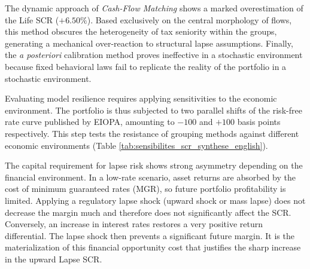 The dynamic approach of \textit{Cash-Flow Matching} shows a marked overestimation of the Life SCR ($+6.50\%$). Based exclusively on the central morphology of flows, this method obscures the heterogeneity of tax seniority within the groups, generating a mechanical over-reaction to structural lapse assumptions. Finally, the \textit{a posteriori} calibration method proves ineffective in a stochastic environment because fixed behavioral laws fail to replicate the reality of the portfolio in a stochastic environment.

Evaluating model resilience requires applying sensitivities to the economic environment. The portfolio is thus subjected to two parallel shifts of the risk-free rate curve published by EIOPA, amounting to $-100$ and $+100$ basis points respectively. This step tests the resistance of grouping methods against different economic environments (Table \ref{tab:sensibilites_scr_synthese_english}).

\begin{table}[H]
    \centering
    \renewcommand{\arraystretch}{1.4}
    \caption{Relative errors on Global SCR and Lapse SCR according to interest rate curve shifts.}
    \label{tab:sensibilites_scr_synthese_english}
\end{table}

The capital requirement for lapse risk shows strong asymmetry depending on the financial environment. In a low-rate scenario, asset returns are absorbed by the cost of minimum guaranteed rates (MGR), so future portfolio profitability is limited. Applying a regulatory lapse shock (upward shock or mass lapse) does not decrease the margin much and therefore does not significantly affect the SCR. Conversely, an increase in interest rates restores a very positive return differential. The lapse shock then prevents a significant future margin. It is the materialization of this financial opportunity cost that justifies the sharp increase in the upward Lapse SCR.


